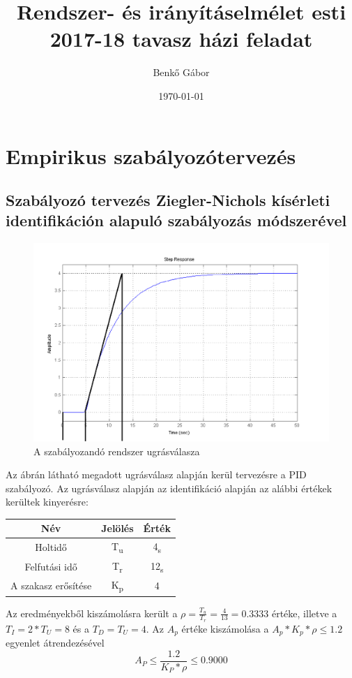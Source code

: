 \documentclass[12pt]{article}
\title{Rendszer- és irányításelmélet esti 2017-18 tavasz házi feladat}
\author{Benkő Gábor}
\date{\today}
\begin{document}
\maketitle
\newpage
\section{Empirikus szabályozótervezés}
\subsection{Szabályozó tervezés Ziegler-Nichols kísérleti identifikáción alapuló szabályozás módszerével}
\begin{figure}[h]
    \centering
	\includegraphics[scale=.4]{stepresponse}
	\caption{A szabályozandó rendszer ugrásválasza}
	\label{fig:stepresponse}
\end{figure}
Az ábrán látható megadott ugrásválasz alapján kerül tervezésre a PID szabályozó. Az ugrásválasz alapján az identifikáció alapján az alábbi értékek kerültek kinyerésre:
\begin{center}
\begin{tabular}{|c c c|}
\hline Név & Jelölés & Érték \\
\hline \hline
Holtidő & T\textsubscript{u} & 4\textsubscript{s} \\
\hline
Felfutási idő & T\textsubscript{r} & 12\textsubscript{s} \\
\hline
A szakasz erősítése & K\textsubscript{p} & 4 \\
\hline
\end{tabular}
\end{center}
Az eredményekből kiszámolásra került a $\rho=\frac{T_u}{T_r}=\frac{4}{13}=0.3333$ értéke, illetve a $T_I=2*T_U=8$ és a $T_D=T_U=4$. Az $A_p$ értéke kiszámolása a $A_p*K_p*\rho\leq1.2$ egyenlet átrendezésével \[A_P\leq\frac{1.2}{K_P*\rho}\leq0.9000\]
\end{document}
